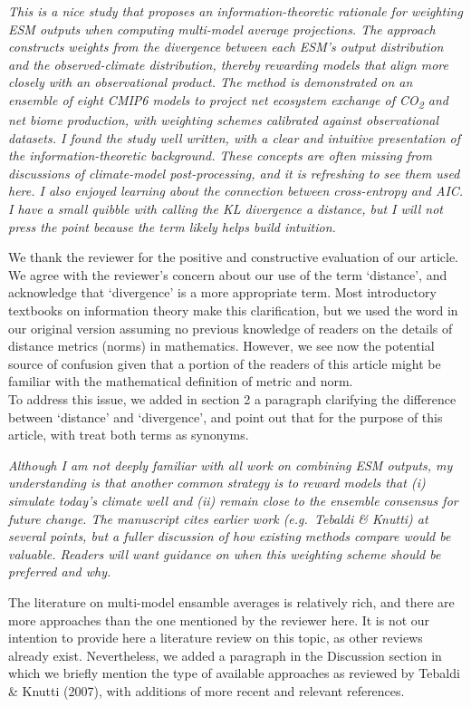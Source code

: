 \emph{This is a nice study that proposes an information-theoretic
rationale for weighting ESM outputs when computing multi-model average
projections. The approach constructs weights from the divergence between
each ESM's output distribution and the observed-climate distribution,
thereby rewarding models that align more closely with an observational
product. The method is demonstrated on an ensemble of eight CMIP6 models
to project net ecosystem exchange of CO\textsubscript{2} and net biome
production, with weighting schemes calibrated against observational
datasets. I found the study well written, with a clear and intuitive
presentation of the information-theoretic background. These concepts are
often missing from discussions of climate-model post-processing, and it
is refreshing to see them used here. I also enjoyed learning about the
connection between cross-entropy and AIC. I have a small quibble with
calling the KL divergence a distance, but I will not press the point
because the term likely helps build intuition.}

We thank the reviewer for the positive and constructive evaluation of
our article. We agree with the reviewer's concern about our use of the
term `distance', and acknowledge that `divergence' is a more appropriate
term. Most introductory textbooks on information theory make this
clarification, but we used the word in our original version assuming no
previous knowledge of readers on the details of distance metrics (norms)
in mathematics. However, we see now the potential source of confusion
given that a portion of the readers of this article might be familiar
with the mathematical definition of metric and norm.\\
To address this issue, we added in section 2 a paragraph clarifying the
difference between `distance' and `divergence', and point out that for
the purpose of this article, with treat both terms as synonyms.

\emph{Although I am not deeply familiar with all work on combining ESM
outputs, my understanding is that another common strategy is to reward
models that (i) simulate today's climate well and (ii) remain close to
the ensemble consensus for future change. The manuscript cites earlier
work (e.g.~Tebaldi \& Knutti) at several points, but a fuller discussion
of how existing methods compare would be valuable. Readers will want
guidance on when this weighting scheme should be preferred and why.}

The literature on multi-model ensamble averages is relatively rich, and
there are more approaches than the one mentioned by the reviewer here.
It is not our intention to provide here a literature review on this
topic, as other reviews already exist. Nevertheless, we added a
paragraph in the Discussion section in which we briefly mention the type
of available approaches as reviewed by Tebaldi \& Knutti (2007), with
additions of more recent and relevant references.

